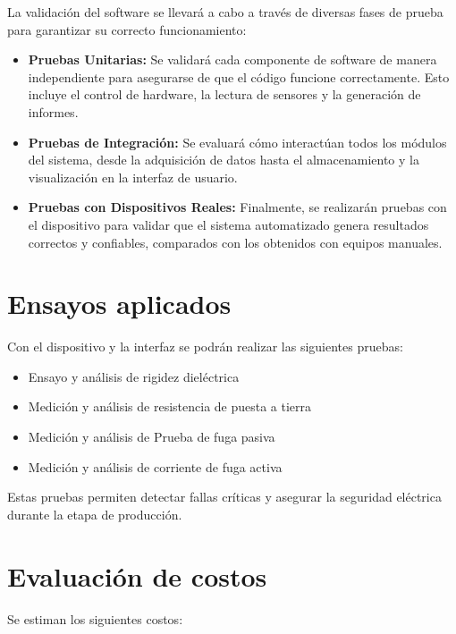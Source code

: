 \documentclass[a4paper,12pt]{article}
\begin{document}
La validación del software se llevará a cabo a través de diversas fases de prueba para garantizar su correcto funcionamiento:
\begin{itemize}
    \item \textbf{Pruebas Unitarias:} Se validará cada componente de software de manera independiente para asegurarse de que el código funcione correctamente. Esto incluye el control de hardware, la lectura de sensores y la generación de informes.
    \item \textbf{Pruebas de Integración:} Se evaluará cómo interactúan todos los módulos del sistema, desde la adquisición de datos hasta el almacenamiento y la visualización en la interfaz de usuario.
    \item \textbf{Pruebas con Dispositivos Reales:} Finalmente, se realizarán pruebas con el dispositivo para validar que el sistema automatizado genera resultados correctos y confiables, comparados con los obtenidos con equipos manuales.
\end{itemize}

\section{Ensayos aplicados}
Con el dispositivo y la interfaz se podrán realizar las siguientes pruebas:
\begin{itemize}
    \item Ensayo y análisis de rigidez dieléctrica
    \item Medición y análisis de resistencia de puesta a tierra
    \item Medición y análisis de Prueba de fuga pasiva
    \item Medición y análisis de corriente de fuga activa
\end{itemize}

Estas pruebas permiten detectar fallas críticas y asegurar la seguridad eléctrica durante la etapa de producción.

\section{Evaluación de costos}

Se estiman los siguientes costos:
\end{document}
